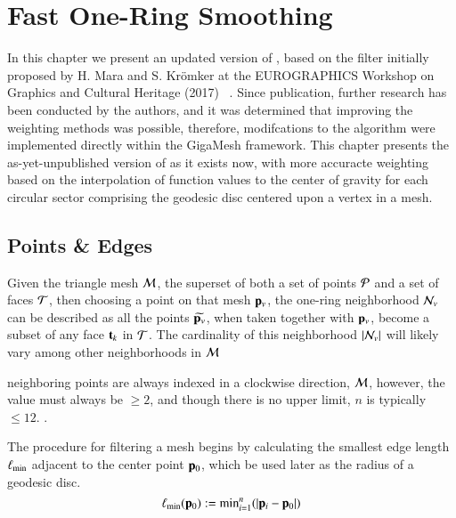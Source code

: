 \chapter{Fast One-Ring Smoothing}
\label{ch4}
In this chapter we present an updated version of , based on the filter initially proposed by H. Mara and S. Krömker at the EUROGRAPHICS Workshop on Graphics and Cultural Heritage (2017) ~\cite[s.~3.2]{Mara17}. Since publication, further research has been conducted by the authors, and it was determined that improving the weighting methods was possible, therefore, modifcations to the algorithm were implemented directly within the GigaMesh  framework. This chapter presents the as-yet-unpublished version of  as it exists now, with more accuracte weighting based on the interpolation of function values to the center of gravity for each circular sector comprising the geodesic disc centered upon a vertex in a mesh.
%
%
%
%
%
\section{Points \& Edges}
\label{ch4sPE}
Given the triangle mesh $\mathcal{M}$, the superset of both a set of points $\mathcal{P}$ and a set of faces $\mathcal{T}$, then choosing a point on that mesh $\mathbf{p}_v$, the one-ring neighborhood $\mathcal{N}_v$ can be described as all the points $\widetilde{\mathbf{p}_v}$, when taken together with $\mathbf{p}_v$, become a subset of any face $\mathbf{t}_k$ in $\mathcal{T}$. The cardinality of this neighborhood $|\mathcal{N}_v|$ will likely vary among other neighborhoods in $\mathcal{M}$

neighboring points are always indexed in a clockwise direction,  $\mathcal{M}$, however, the value must always be $\geq 2$, and though there is no upper limit, $n$ is typically $\leq 12$.%
.%



The procedure for filtering a mesh begins by calculating the smallest edge length $\ell_\text{min}$ adjacent to the center point $\mathbf{p}_0$, which be used later as the radius of a geodesic disc.
\begin{equation}
	\ell_\text{min}(\mathbf{p}_0) := \text{min}^n_{i=1} (|\mathbf{p}_i - \mathbf{p}_0|)
	\label{eq:localMinimumEdgeLength}
\end{equation}%
%

